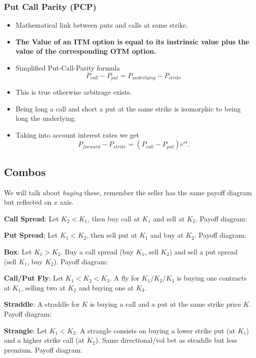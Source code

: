 \documentclass{article}
\begin{document}
\subsubsection{Put Call Parity (PCP)}
\begin{itemize}
    \item Mathematical link between puts and calls at same strike.
    \item \textbf{The Value of an ITM option is equal to its instrinsic value
    plus the value of the corresponding OTM option.}
    \item Simplified Put-Call-Parity formula
    \begin{equation*}
        P_{call} - P_{put} = P_{underlying} - P_{strike}
    \end{equation*}
    \item This is true otherwise arbitrage exists.
    \item Being long a call and short a put at the same strike is isomorphic
    to being long the underlying.
    \item Taking into account interest rates we get
    \begin{equation*}
        P_{forward} - P_{strike} = (P_{call} - P_{put})e^{rt}.
    \end{equation*}
\end{itemize}

\subsection{Combos}
We will talk about \textit{buying} these, remember the seller has the same
payoff diagram but reflected on $x$ axis.

\textbf{Call Spread}: 
Let $K_2 < K_1$, then buy call at $K_1$ and sell at $K_2$. Payoff diagram:

\textbf{Put Spread}: 
Let $K_1 < K_2$, then sell put at $K_1$ and buy at $K_2$. Payoff diagram:

\textbf{Box}: 
Let $K_1 > K_2$. Buy a call spread (buy $K_1$, sell $K_2$)
and sell a put spread (sell $K_1$, buy $K_2$). Payoff diagram:

\textbf{Call/Put Fly}: 
Let $K_1 < K_2 < K_3$. A fly for $K_1/K_2/K_3$ is buying one contracts at $K_1$,
selling two at $K_2$ and buying one at $K_3$.

\textbf{Straddle}: A straddle for $K$ is buying a call and a put at the same
strike price $K$. Payoff diagram:

\textbf{Strangle}: Let $K_1 < K_2$. A strangle consists on buying a lower strike
put (at $K_1$) and a higher strike call (at $K_2$). Same directional/vol bet as
straddle but less premium. Payoff diagram:
\end{document}
